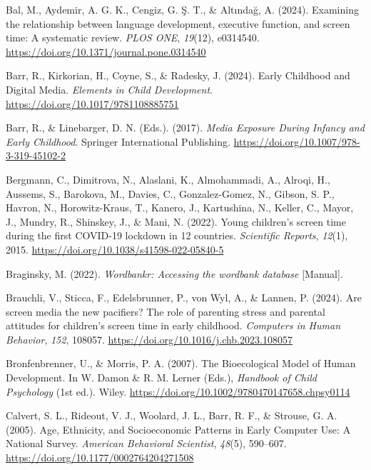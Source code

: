 \documentclass[
  man,
  floatsintext,
  longtable,
  nolmodern,
  notxfonts,
  notimes,
  colorlinks=true,linkcolor=blue,citecolor=blue,urlcolor=blue]{apa7}
\newlength{\cslhangindent}
\newenvironment{CSLReferences}[2] %
 {\begin{list}{}{%
  \setlength{\itemindent}{0pt}
  \setlength{\leftmargin}{0pt}
  \setlength{\parsep}{0pt}
  \ifodd #1
   \setlength{\leftmargin}{\cslhangindent}
   \setlength{\itemindent}{-1\cslhangindent}
  \fi
  \setlength{\itemsep}{#2\baselineskip}}}
 {\end{list}}
\begin{document}
\begin{CSLReferences}{1}{0}
Bal, M., Aydemir, A. G. K., Cengiz, G. Ş. T., \& Altındağ, A. (2024).
Examining the relationship between language development, executive
function, and screen time: {A} systematic review. \emph{PLOS ONE},
\emph{19}(12), e0314540.
\url{https://doi.org/10.1371/journal.pone.0314540}

Barr, R., Kirkorian, H., Coyne, S., \& Radesky, J. (2024). Early
{Childhood} and {Digital Media}. \emph{Elements in Child Development}.
\url{https://doi.org/10.1017/9781108885751}

Barr, R., \& Linebarger, D. N. (Eds.). (2017). \emph{Media {Exposure
During Infancy} and {Early Childhood}}. Springer International
Publishing. \url{https://doi.org/10.1007/978-3-319-45102-2}

Bergmann, C., Dimitrova, N., Alaslani, K., Almohammadi, A., Alroqi, H.,
Aussems, S., Barokova, M., Davies, C., Gonzalez-Gomez, N., Gibson, S.
P., Havron, N., Horowitz-Kraus, T., Kanero, J., Kartushina, N., Keller,
C., Mayor, J., Mundry, R., Shinskey, J., \& Mani, N. (2022). Young
children's screen time during the first {COVID-19} lockdown in 12
countries. \emph{Scientific Reports}, \emph{12}(1), 2015.
\url{https://doi.org/10.1038/s41598-022-05840-5}

Braginsky, M. (2022). \emph{Wordbankr: {Accessing} the wordbank
database} {[}Manual{]}.

Brauchli, V., Sticca, F., Edelsbrunner, P., von Wyl, A., \& Lannen, P.
(2024). Are screen media the new pacifiers? {The} role of parenting
stress and parental attitudes for children's screen time in early
childhood. \emph{Computers in Human Behavior}, \emph{152}, 108057.
\url{https://doi.org/10.1016/j.chb.2023.108057}

Bronfenbrenner, U., \& Morris, P. A. (2007). The {Bioecological Model}
of {Human Development}. In W. Damon \& R. M. Lerner (Eds.),
\emph{Handbook of {Child Psychology}} (1st ed.). Wiley.
\url{https://doi.org/10.1002/9780470147658.chpsy0114}

Calvert, S. L., Rideout, V. J., Woolard, J. L., Barr, R. F., \& Strouse,
G. A. (2005). Age, {Ethnicity}, and {Socioeconomic Patterns} in {Early
Computer Use}: {A National Survey}. \emph{American Behavioral
Scientist}, \emph{48}(5), 590--607.
\url{https://doi.org/10.1177/0002764204271508}


\end{CSLReferences}
\end{document}
